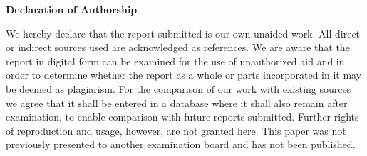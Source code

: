 \documentclass[12pt]{article}
\begin{document}
\RaggedRight


\newpage


\Large
\noindent
\textbf{Declaration of Authorship} 
\vspace{0.5cm}
\noindent
\normalsize

We hereby declare that the report submitted is our own unaided work. All direct 
or indirect sources used are acknowledged as references. We are aware that the 
report in digital form can be examined for the use of unauthorized aid and in 
order to determine whether the report as a whole or parts incorporated in it may 
be deemed as plagiarism. For the comparison of our work with existing sources we 
agree that it shall be entered in a database where it shall also remain after 
examination, to enable comparison with future reports submitted. Further rights 
of reproduction and usage, however, are not granted here. This paper was not 
previously presented to another examination board and has not been published. 

\end{document}
